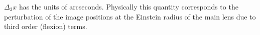 $\Delta_3 x$ has the units of arcseconds. Physically this quantity corresponds to the perturbation of the image positions at the Einstein radius of the main lens due to third order (flexion) terms. 
